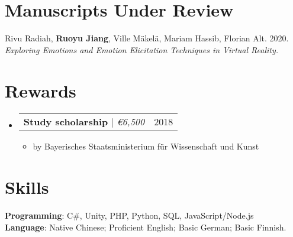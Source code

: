 \documentclass[letterpaper,11pt]{article}
\makeatletter
\newcommand{\resumeItem}[1]{
  \item\small{
    {#1 \vspace{-2pt}}
  }
}
\newcommand{\resumeProjectHeading}[2]{
    \item
    \begin{tabular*}{0.97\textwidth}{l@{\extracolsep{\fill}}r}
      \small#1 & #2 \\
    \end{tabular*}\vspace{-7pt}
}
\newcommand{\resumeSubHeadingListStart}{\begin{itemize}[leftmargin=0.15in, label={}]}
\newcommand{\resumeSubHeadingListEnd}{\end{itemize}}
\newcommand{\resumeItemListStart}{\begin{itemize}}
\newcommand{\resumeItemListEnd}{\end{itemize}\vspace{-5pt}}
\makeatother
\begin{document}
  
\section{Manuscripts Under Review}
    {Rivu Radiah, \textbf{Ruoyu Jiang}, Ville Mäkelä, Mariam Hassib, Florian Alt. 2020. \textit{Exploring Emotions and Emotion Elicitation Techniques in Virtual Reality.}}
  
  
\section{Rewards}
    \resumeSubHeadingListStart
      \resumeProjectHeading
          {\textbf{Study scholarship} $|$ \emph{\euro 6,500}}{2018}
          \resumeItemListStart
            \resumeItem{by Bayerisches Staatsministerium für Wissenschaft und Kunst}
          \resumeItemListEnd
    \resumeSubHeadingListEnd

%
\section{Skills}
 \begin{itemize}[leftmargin=0.15in, label={}]
    \small{\item{
     \textbf{Programming}{: C\#, Unity, PHP, Python, SQL, JavaScript/Node.js } \\
     \textbf{Language}{: Native Chinese; Proficient English; Basic German; Basic Finnish.}
    }}
 \end{itemize}

\end{document}
